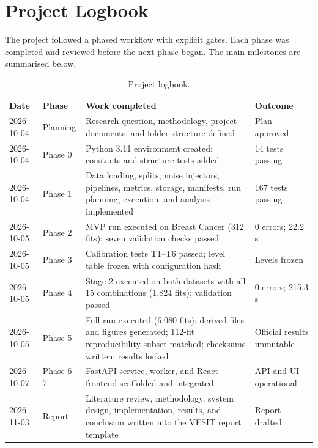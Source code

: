 \chapter{Project Logbook}

The project followed a phased workflow with explicit gates. Each phase was completed and reviewed before the next phase began. The main milestones are summarised below.

\begin{table}[H]
\centering
\caption{Project logbook.}
\label{tab:logbook}
\small
\begin{tabular}{p{1.8cm}p{2.4cm}p{6.4cm}p{2.2cm}}
\toprule
\textbf{Date} & \textbf{Phase} & \textbf{Work completed} & \textbf{Outcome} \\
\midrule
2026-10-04 & Planning & Research question, methodology, project documents, and folder structure defined & Plan approved \\
2026-10-04 & Phase 0 & Python 3.11 environment created; constants and structure tests added & 14 tests passing \\
2026-10-04 & Phase 1 & Data loading, splits, noise injectors, pipelines, metrics, storage, manifests, run planning, execution, and analysis implemented & 167 tests passing \\
2026-10-05 & Phase 2 & MVP run executed on Breast Cancer (312 fits); seven validation checks passed & 0 errors; 22.2 s \\
2026-10-05 & Phase 3 & Calibration tests T1--T6 passed; level table frozen with configuration hash & Levels frozen \\
2026-10-05 & Phase 4 & Stage 2 executed on both datasets with all 15 combinations (1,824 fits); validation passed & 0 errors; 215.3 s \\
2026-10-05 & Phase 5 & Full run executed (6,080 fits); derived files and figures generated; 112-fit reproducibility subset matched; checksums written; results locked & Official results immutable \\
2026-10-07 & Phase 6--7 & FastAPI service, worker, and React frontend scaffolded and integrated & API and UI operational \\
2026-11-03 & Report & Literature review, methodology, system design, implementation, results, and conclusion written into the VESIT report template & Report drafted \\
\bottomrule
\end{tabular}
\end{table}
